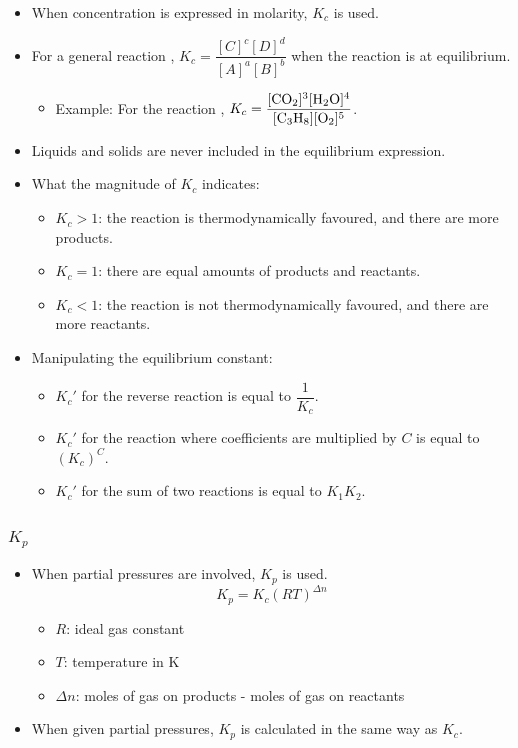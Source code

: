 \documentclass{article}
\begin{document}
\begin{itemize}
    \item When concentration is expressed in molarity, $K_c$ is used. 
    \item For a general reaction , $K_c = \dfrac{[C]^c [D]^d}{[A]^a [B]^b}$ when the reaction is at equilibrium.
    \begin{itemize}
        \item Example: For the reaction , $K_c = \dfrac{[\ce{CO2}]^3 [\ce{H2O}]^4}{[\ce{C3H8}] [\ce{O2}]^5}$. 
    \end{itemize}
    \item Liquids and solids are never included in the equilibrium expression.
    \item What the magnitude of $K_c$ indicates:
    \begin{itemize}
        \item $K_c > 1$: the reaction is thermodynamically favoured, and there are more products.
        \item $K_c = 1$: there are equal amounts of products and reactants.
        \item $K_c < 1$: the reaction is not thermodynamically favoured, and there are more reactants.
    \end{itemize}
    \item Manipulating the equilibrium constant:
    \begin{itemize}
        \item $K_c'$ for the reverse reaction is equal to $\dfrac{1}{K_c}$.
        \item $K_c'$ for the reaction where coefficients are multiplied by $C$ is equal to $(K_c)^C$.
        \item $K_c'$ for the sum of two reactions is equal to $K_1 K_2$.
    \end{itemize}
\end{itemize}

\subsubsection{$K_p$}

\begin{itemize}
    \item When partial pressures are involved, $K_p$ is used.
    \begin{equation*}
        K_p = K_c (RT)^{\Delta n}
    \end{equation*}
    \begin{itemize}
        \item $R$: ideal gas constant
        \item $T$: temperature in \si{\kelvin}
        \item $\Delta n$: moles of gas on products - moles of gas on reactants 
    \end{itemize}
    \item When given partial pressures, $K_p$ is calculated in the same way as $K_c$.
\end{itemize}
\end{document}
